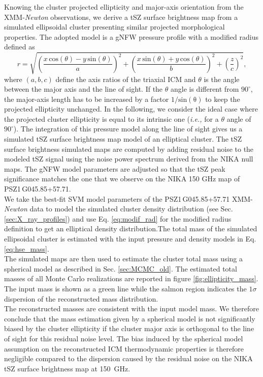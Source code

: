 \documentclass[traditabstract]{aa}
\begin{document}
\indent Knowing the cluster projected ellipticity and major-axis orientation from the XMM-{\it Newton} observations, we derive a tSZ surface brightness map from a simulated ellipsoidal cluster presenting similar projected morphological properties. The adopted model is a gNFW pressure profile with a modified radius defined as
\begin{equation}
r = \sqrt{\left(\frac{x \, \mathrm{cos}(\theta) - y \, \mathrm{sin}(\theta)}{a}\right)^2 + \left(\frac{x \, \mathrm{sin}(\theta) + y \, \mathrm{cos}(\theta)}{b}\right)^2 + \left(\frac{z}{c}\right)^2},
\label{eq:modif_rad}
\end{equation}
where $(a, b, c)$ define the axis ratios of the triaxial ICM and $\theta$ is the angle between the major axis and the line of sight. If the $\theta$ angle is different from $90^{\circ}$, the major-axis length has to be increased by a factor $1/\mathrm{sin(\theta)}$ to keep the projected ellipticity unchanged. In the following, we consider the ideal case where the projected cluster ellipticity is equal to its intrinsic one (\emph{i.e.,} for a $\theta$ angle of $90^{\circ}$). 
The integration of this pressure model along the line of sight gives us a simulated tSZ surface brightness map model of an elliptical cluster. The tSZ surface brightness simulated maps are computed by adding residual noise to the modeled tSZ signal using the noise power spectrum derived from the NIKA null maps. The gNFW model parameters are adjusted so that the tSZ peak significance matches the one that we observe on the NIKA 150 GHz map of \mbox{PSZ1\,G045.85+57.71}.\\
\indent We take the best-fit SVM model parameters of the \mbox{PSZ1\,G045.85+57.71} XMM-{\it Newton} data to model the simulated cluster density distribution (see Sec. \ref{sec:X_ray_profiles}) and use Eq. \ref{eq:modif_rad} for the modified radius definition to get an elliptical density distribution.The total mass of the simulated ellipsoidal cluster is estimated with the input pressure and density models in Eq. \ref{eq:hse_mass}.\\
\indent The simulated maps are then used to estimate the cluster total mass using a spherical model as described in Sec. \ref{sec:MCMC_old}. The estimated total masses of all Monte Carlo realizations are reported in figure \ref{fig:ellipticity_mass}. The input mass is shown as a green line while the salmon region indicates the $1\sigma$ dispersion of the reconstructed mass distribution.\\
\indent The reconstructed masses are consistent with the input model mass. We therefore conclude that the mass estimation given by a spherical model is not significantly biased by the cluster ellipticity if the cluster major axis is orthogonal to the line of sight for this residual noise level. The bias induced by the spherical model assumption on the reconstructed ICM thermodynamic properties is therefore negligible compared to the dispersion caused by the residual noise on the NIKA tSZ surface brightness map at 150~GHz.\\
\end{document}
